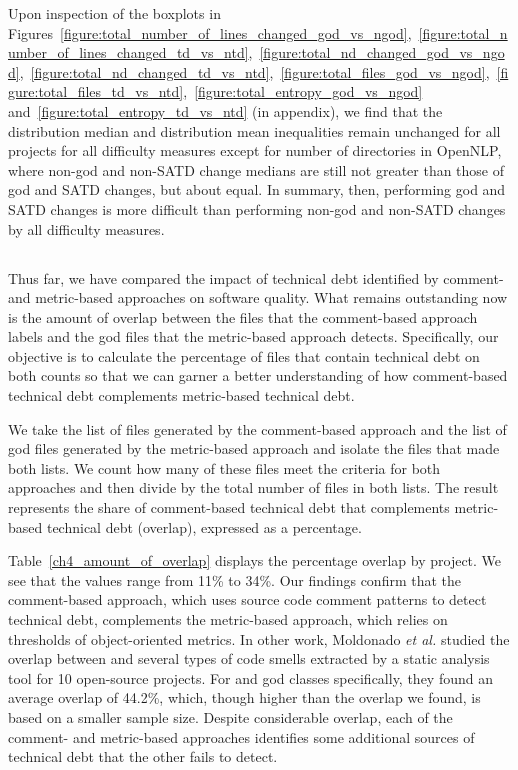{Upon inspection of the boxplots in Figures~\ref{figure:total_number_of_lines_changed_god_vs_ngod},~\ref{figure:total_number_of_lines_changed_td_vs_ntd},~\ref{figure:total_nd_changed_god_vs_ngod},~\ref{figure:total_nd_changed_td_vs_ntd},~\ref{figure:total_files_god_vs_ngod},~\ref{figure:total_files_td_vs_ntd},~\ref{figure:total_entropy_god_vs_ngod} and~\ref{figure:total_entropy_td_vs_ntd} (in appendix), we find that the distribution median and distribution mean inequalities remain unchanged for all projects for all difficulty measures except for number of directories in OpenNLP, where non-god and non-SATD change medians are still not greater than those of god and SATD changes, but about equal. In summary, then, performing god and SATD changes is more difficult than performing non-god and non-SATD changes by all difficulty measures.


\subsection*{\chapterIVrqIV}



Thus far, we have compared the impact of technical debt identified by comment- and metric-based approaches on software quality. What remains outstanding now is the amount of overlap between the \SATD files that the comment-based approach labels and the god files that the metric-based approach detects. Specifically, our objective is to calculate the percentage of files that contain technical debt on both counts so that we can garner a better understanding of how comment-based technical debt complements metric-based technical debt.


We take the list of \SATD files generated by the comment-based approach and the list of god files generated by the metric-based approach and isolate the files that made both lists. We count how many of these files meet the criteria for both approaches and then divide by the total number of files in both lists. The result represents the share of comment-based technical debt that complements metric-based technical debt (overlap), expressed as a percentage.



Table~\ref{ch4_amount_of_overlap} displays the percentage overlap by project. We see that the values range from 11\% to 34\%. Our findings confirm that the comment-based approach, which uses source code comment patterns to detect technical debt, complements the metric-based approach, which relies on thresholds of object-oriented metrics. In other work, Moldonado \textit{et al.} \cite{Maldonado_TSE2017} studied the overlap between \SATD and several types of code smells extracted by a static analysis tool for 10 open-source projects. For \SATD and god classes specifically, they found an average overlap of 44.2\%, which, though higher than the overlap we found, is based on a smaller sample size. Despite considerable overlap, each of the comment- and metric-based approaches identifies some additional sources of technical debt that the other fails to detect.

}
